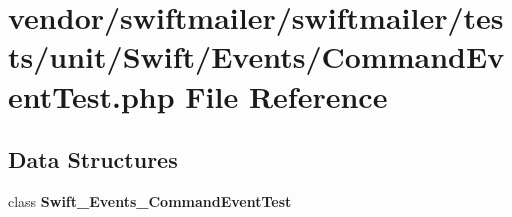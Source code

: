\section{vendor/swiftmailer/swiftmailer/tests/unit/\+Swift/\+Events/\+Command\+Event\+Test.php File Reference}
\label{_command_event_test_8php}
\subsection*{Data Structures}
\begin{DoxyCompactItemize}
\item 
class {\bf Swift\+\_\+\+Events\+\_\+\+Command\+Event\+Test}
\end{DoxyCompactItemize}
